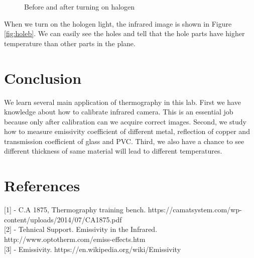 \documentclass[english]{article}
\begin{document}
\begin{figure}[H]
	\centering
	\caption{Before and after turning on halogen}
	\label{fig:hole}
\end{figure}

When we turn on the hologen light, the infrared image is shown in Figure \ref{fig:holeb}. We can easily see the holes and tell that the hole parts have higher temperature than other parts in the plane.

\section{Conclusion}
We learn several main application of thermography in this lab. First we have knowledge about how to calibrate infrared camera. This is an essential job because only after calibration can we acquire correct images. Second, we study how to measure emissivity coefficient of different metal, reflection of copper and transmission coefficient of glass and PVC. Third, we also have a chance to see different thickness of same material will lead to different temperatures.
\section{References}
{[}1{]} - C.A 1875, Thermography training bench. https://camatsystem.com/wp-content/uploads/2014/07/CA1875.pdf\\
{[}2{]} - Tehnical Support. Emissivity in the Infrared. http://www.optotherm.com/emiss-effects.htm\\
{[}3{]} - Emissivity. https://en.wikipedia.org/wiki/Emissivity
\end{document}
